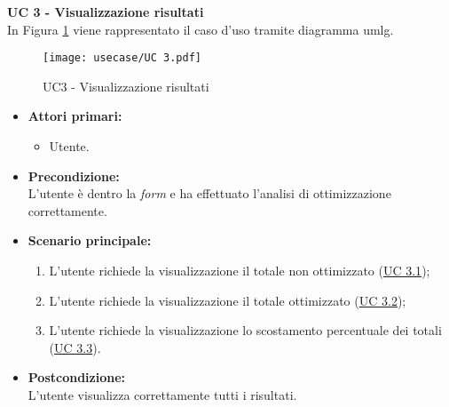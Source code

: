 \vspace{0.4cm}

\noindent \textbf{\large UC 3 - Visualizzazione risultati}\\[0.2cm]
\label{uc:visualizzazione-risultati}
\noindent In Figura \ref{use-case-3} viene rappresentato il caso d'uso tramite diagramma \gls{umlg}.
\begin{figure}[!h] 
    \centering 
    \texttt{[image: usecase/UC 3.pdf]} 
    \caption{UC3 - Visualizzazione risultati}
	\label{use-case-3}
\end{figure}
\begin{itemize}

	\item \textbf{Attori primari: }
		\begin{itemize}
			\item Utente.
		\end{itemize}

	\item \textbf{Precondizione: }\\[0.3cm]
		L'utente è dentro la \textit{form} e ha effettuato l'analisi di ottimizzazione correttamente.

	\item \textbf{Scenario principale: }
		\begin{enumerate}
			\item L'utente richiede la visualizzazione il totale non ottimizzato (\hyperref[uc:visualizzazione-totale-non-ottimizzato]{UC 3.1});
			\item L'utente richiede la visualizzazione il totale ottimizzato (\hyperref[uc:visualizzazione-totale-ottimizzato]{UC 3.2});
			\item L'utente richiede la visualizzazione lo scostamento percentuale dei totali (\hyperref[uc:visualizzazione-scostamento-percentuale-totali]{UC 3.3}).
		\end{enumerate}
		

	\item \textbf{Postcondizione: }\\[0.3cm]
		L'utente visualizza correttamente tutti i risultati.

\end{itemize}

\vspace{0.4cm}

\newpage

